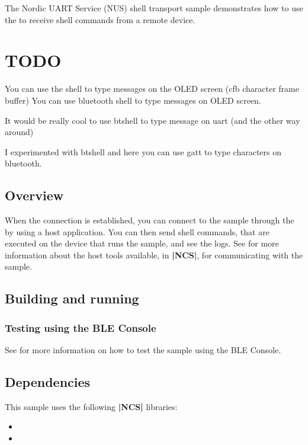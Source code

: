\documentclass[letterpaper,10pt,english]{sphinxmanual}
\begin{document}
The Nordic UART Service (NUS) shell transport sample demonstrates how to use the  to receive shell commands from a remote device.


\section{TODO}
\label{\detokenize{samples/shell_bt_nus/README:todo}}
You can use the shell to type messages on the OLED screen (cfb character frame buffer)
You can use bluetooth shell to type messages on OLED screen.

It would be really cool to use bt\sphinxhyphen{}shell to type message on uart (and the other way around)

I experimented with bt\sphinxhyphen{}shell and here you can use gatt to type characters on bluetooth.


\subsection{Overview}
\label{\detokenize{samples/shell_bt_nus/README:overview}}
When the connection is established, you can connect to the sample through the  by using a host application.
You can then send shell commands, that are executed on the device that runs the sample, and see the logs.
See  for more information about the host tools available, in {\color{red}\bfseries{}|NCS|}, for communicating with the sample.


\subsection{Building and running}
\label{\detokenize{samples/shell_bt_nus/README:building-and-running}}

\subsubsection{Testing using the BLE Console}
\label{\detokenize{samples/shell_bt_nus/README:testing-using-the-ble-console}}
See  for more information on how to test the sample using the BLE Console.


\subsection{Dependencies}
\label{\detokenize{samples/shell_bt_nus/README:dependencies}}
This sample uses the following {\color{red}\bfseries{}|NCS|} libraries:
\begin{itemize}
\item {} 

\item {} 

\end{itemize}
\end{document}
